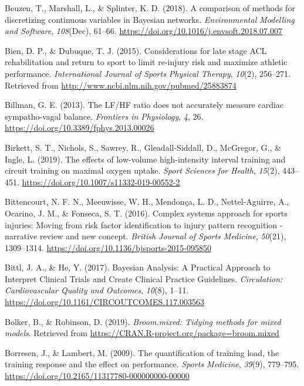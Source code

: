 \documentclass[
  english,
  man,floatsintext]{apa6}
\begin{document}
\leavevmode\hypertarget{ref-Beuzen2018}{}%
Beuzen, T., Marshall, L., \& Splinter, K. D. (2018). A comparison of methods for discretizing continuous variables in Bayesian networks. \emph{Environmental Modelling and Software}, \emph{108}(Dec), 61--66. \url{https://doi.org/10.1016/j.envsoft.2018.07.007}

\leavevmode\hypertarget{ref-Bien2015}{}%
Bien, D. P., \& Dubuque, T. J. (2015). Considerations for late stage ACL rehabilitation and return to sport to limit re-injury risk and maximize athletic performance. \emph{International Journal of Sports Physical Therapy}, \emph{10}(2), 256--271. Retrieved from \url{http://www.ncbi.nlm.nih.gov/pubmed/25883874}

\leavevmode\hypertarget{ref-Billman2013}{}%
Billman, G. E. (2013). The LF/HF ratio does not accurately measure cardiac sympatho-vagal balance. \emph{Frontiers in Physiology}, \emph{4}, 26. \url{https://doi.org/10.3389/fphys.2013.00026}

\leavevmode\hypertarget{ref-Birkett2019}{}%
Birkett, S. T., Nichols, S., Sawrey, R., Gleadall-Siddall, D., McGregor, G., \& Ingle, L. (2019). The effects of low-volume high-intensity interval training and circuit training on maximal oxygen uptake. \emph{Sport Sciences for Health}, \emph{15}(2), 443--451. \url{https://doi.org/10.1007/s11332-019-00552-2}

\leavevmode\hypertarget{ref-Bittencourt2016}{}%
Bittencourt, N. F. N., Meeuwisse, W. H., Mendonça, L. D., Nettel-Aguirre, A., Ocarino, J. M., \& Fonseca, S. T. (2016). Complex systems approach for sports injuries: Moving from risk factor identification to injury pattern recognition - narrative review and new concept. \emph{British Journal of Sports Medicine}, \emph{50}(21), 1309--1314. \url{https://doi.org/10.1136/bjsports-2015-095850}

\leavevmode\hypertarget{ref-Bittl2017}{}%
Bittl, J. A., \& He, Y. (2017). Bayesian Analysis: A Practical Approach to Interpret Clinical Trials and Create Clinical Practice Guidelines. \emph{Circulation: Cardiovascular Quality and Outcomes}, \emph{10}(8), 1--11. \url{https://doi.org/10.1161/CIRCOUTCOMES.117.003563}

\leavevmode\hypertarget{ref-R-broom.mixed}{}%
Bolker, B., \& Robinson, D. (2019). \emph{Broom.mixed: Tidying methods for mixed models}. Retrieved from \url{https://CRAN.R-project.org/package=broom.mixed}

\leavevmode\hypertarget{ref-Borresen2009}{}%
Borresen, J., \& Lambert, M. (2009). The quantification of training load, the training response and the effect on performance. \emph{Sports Medicine}, \emph{39}(9), 779--795. \url{https://doi.org/10.2165/11317780-000000000-00000}
\end{document}
